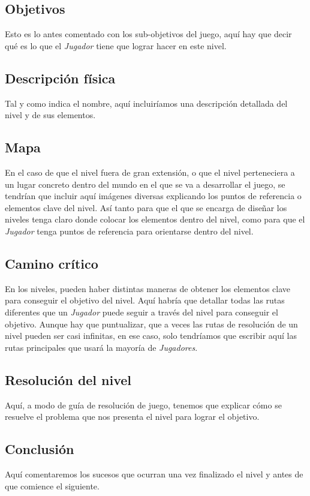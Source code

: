         \subsection{Objetivos}
        Esto es lo antes comentado con los sub-objetivos del juego, aquí hay que decir qué es lo que el \emph{Jugador} tiene que lograr hacer en este nivel.
        \subsection{Descripción física}
        Tal y como indica el nombre, aquí incluiríamos una descripción detallada del nivel y de sus elementos.
        \subsection{Mapa}
        En el caso de que el nivel fuera de gran extensión, o que el nivel perteneciera a un lugar concreto dentro del mundo en el que se va a desarrollar el juego, se tendrían que incluir aquí imágenes diversas explicando los puntos de referencia o elementos clave del nivel. Así tanto para que el que se encarga de diseñar los niveles tenga claro donde colocar los elementos dentro del nivel, como para que el \emph{Jugador} tenga puntos de referencia para orientarse dentro del nivel.
        \subsection{Camino crítico}
        En los niveles, pueden haber distintas maneras de obtener los elementos clave para conseguir el objetivo del nivel. Aquí habría que detallar todas las rutas diferentes que un \emph{Jugador} puede seguir a través del nivel para conseguir el objetivo. Aunque hay que puntualizar, que a veces las rutas de resolución de un nivel pueden ser casi infinitas, en ese caso, solo tendríamos que escribir aquí las rutas principales que usará la mayoría de \emph{Jugadores}. 
        \subsection{Resolución del nivel}
        Aquí, a modo de guía de resolución de juego, tenemos que explicar cómo se resuelve el problema que nos presenta el nivel para lograr el objetivo.
        \subsection{Conclusión}
        Aquí comentaremos los sucesos que ocurran una vez finalizado el nivel y antes de que comience el siguiente.
        
